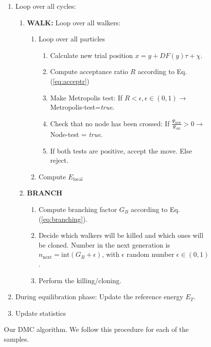 \begin{figure}
\begin{framed}
\begin{enumerate}
\item Loop over all cycles:
\begin{enumerate}
\item \textbf{WALK:} Loop over all walkers:
\begin{enumerate}
\item Loop over all particles
\begin{enumerate}
\item Calculate new trial position $x = y + DF(y)\tau + \chi$.
\item Compute acceptance ratio $R$ according to Eq. (\ref{eq:acceptr})
\item Make Metropolis test: If $R<\epsilon, \epsilon\in(0,1) \rightarrow$ Metropolis-test=\textit{true}.
\item Check that no node has been crossed: If $\frac{\Psi_{\text{new}}}{\Psi_{\text{old}}}>0 \rightarrow $ Node-test = \textit{true}.
\item If both tests are positive, accept the move. Else reject.
\end{enumerate}
\item Compute $E_{\text{local}}$
\end{enumerate}
\item \textbf{BRANCH} 
\begin{enumerate} 
\item Compute branching factor $G_B$ according to Eq. (\ref{eq:branching}).
\item Decide which walkers will be killed and which ones will be cloned. Number in the next generation is $n_{\text{next}} = \text{int}(G_B + \epsilon)$, with $\epsilon$ random number $\epsilon\in(0,1)$.
\item Perform the killing/cloning.
\end{enumerate}
\end{enumerate}
\item During equilibration phase: Update the reference energy $E_T$.
\item Update statistics 
\end{enumerate}
\end{framed}
\caption{Our DMC algorithm. We follow this procedure for each of the samples.}
\label{fig:DMCalgo}
\end{figure}

